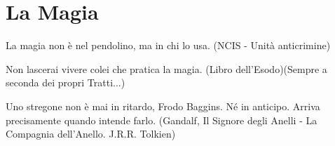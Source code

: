 \section{La Magia}\label{lamagia}

\begin{changemargin}{0.3cm}{0.3cm}\begin{enfasi}{
La magia non è nel pendolino, ma in chi lo usa. (NCIS - Unità anticrimine)

\medskip

Non lascerai vivere colei che pratica la magia. (Libro dell'Esodo)(Sempre a seconda dei propri Tratti...)

\medskip

Uno stregone non è mai in ritardo, Frodo Baggins. Né in anticipo. Arriva precisamente quando intende farlo. (Gandalf, Il Signore degli Anelli - La Compagnia dell'Anello. J.R.R. Tolkien)} \end{enfasi}\end{changemargin} \medskip

